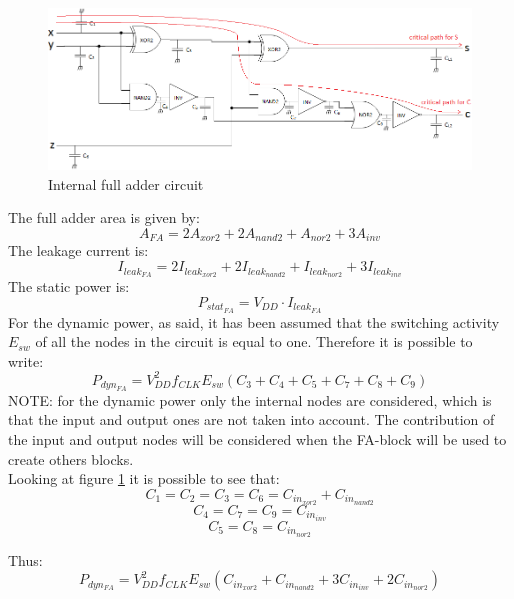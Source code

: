 \begin{figure}[H]
\centering
\includegraphics[width = 14cm]{pentium/fa_interno.png}
\caption{Internal full adder circuit}
\label{fa_interno}
\end{figure}

The full adder area is given by:
\begin{equation}
A_{FA}=2A_{xor2}+2A_{nand2}+A_{nor2}+3A_{inv}
\end{equation}
The leakage current is:
\begin{equation}
I_{leak_{FA}}=2I_{leak_{xor2}}+2I_{leak_{nand2}}+I_{leak_{nor2}}+3I_{leak_{inv}}
\end{equation}
The static power is:
\begin{equation}
P_{stat_{FA}}=V_{DD}\cdot I_{leak_{FA}}
\end{equation}
For the dynamic power, as said, it has been assumed that the switching activity $E_{sw}$ of all the nodes in the circuit is equal to one. Therefore it is possible to write:
\begin{equation}
P_{dyn_{FA}}=V_{DD}^2f_{CLK}E_{sw}(C_3+C_4+C_5+C_7+C_8+C_9)
\end{equation}
NOTE: for the dynamic power only the internal nodes are considered, which is that the input and output ones are not taken into account. The contribution of the input and output nodes will be considered when the FA-block will be used to create others blocks.\\
Looking at figure \ref{fa_interno} it is possible to see that:
\begin{equation}
C_1=C_2=C_3=C_6=C_{in_{xor2}}+C_{in_{nand2}}
\end{equation}
\begin{equation}
C_4=C_7=C_9=C_{in_{inv}}
\end{equation}
\begin{equation}
C_5=C_8=C_{in_{nor2}}
\end{equation}

Thus:
\begin{equation}
P_{dyn_{FA}}=V_{DD}^2f_{CLK}E_{sw}(C_{in_{xor2}}+C_{in_{nand2}}+3C_{in_{inv}}+2C_{in_{nor2}})
\end{equation}

